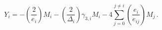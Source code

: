 \begin{equation}
Y_{i}=-\left( \frac{2}{e_{i}}\right) M_{i}-\left( \frac{2}{\Delta _{i}}%
\right) \gamma _{3,i}M_{i}-4\sum_{j=0}^{j\neq i}\left( \frac{e_{i}}{e_{ij}}%
\right) M_{j}\,.
\end{equation}


